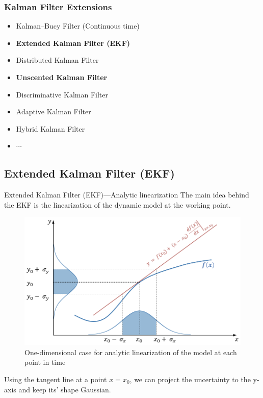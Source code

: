 \begin{frame}
   \frametitle{Kalman Filter Extensions}
   \begin{itemize}
    \item Kalman--Bucy Filter (Continuous time)
    \item \textbf{Extended Kalman Filter (EKF)}
    \item Distributed Kalman Filter
    \item \textbf{Unscented Kalman Filter}
    \item Discriminative Kalman Filter
    \item Adaptive Kalman Filter
    \item Hybrid Kalman Filter
    \item $\cdots$
   \end{itemize}
\end{frame}


\subsection{Extended Kalman Filter (EKF)}
\begin{frame}{Extended Kalman Filter (EKF)---Analytic linearization}
    The main idea behind the EKF is the linearization of the dynamic model at the working point.

    \begin{figure}
        \centering
        \includegraphics[width=0.65\linewidth]{Figures//Part3/1D_AnalyticLinearization.png}
        \caption{One-dimensional case for analytic linearization of the model at each point in time}
        \label{fig:enter-label}
    \end{figure}

    Using the tangent line at a point $x = x_0$, we can project the uncertainty to the y-axis and keep its’ shape Gaussian.
\end{frame}

